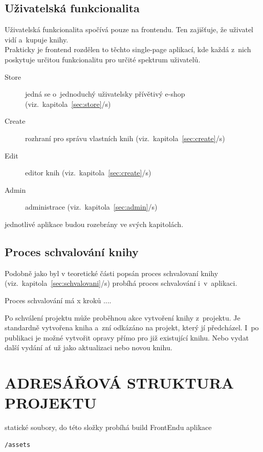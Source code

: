 \documentclass[a4paper,12pt,twoside,BCOR=10mm]{article}
\newcommand{\upc}[1]{\uppercase{#1}} %
\newcommand{\odkazNaKapitolu}[1]{(viz.~kapitola~\ref{#1}/s\pageref{#1})}
\newenvironment{codeframe}{%
  \begin{Sbox} 
    \begin{minipage} 
      {\columnwidth-\leftmargin-\rightmargin-2\fboxsep-2\fboxrule-4pt} 
}{%

  \end{minipage} 
  \end{Sbox} 
  \begin{center} 
    \fcolorbox{black}{codeback}{\TheSbox} 
  \end{center} 
}
\begin{document}
\subsection{Uživatelská funkcionalita}
Uživatelská funkcionalita spočívá pouze na frontendu. Ten zajišťuje, že uživatel vidí a~kupuje knihy.\\
Prakticky je frontend rozdělen to těchto single-page aplikací, kde každá z~nich poskytuje určitou funkcionalitu pro určité spektrum uživatelů.\\

\begin{description}
 \item[Store] jedná se o~jednoduchý uživatelsky přívětivý e-shop \odkazNaKapitolu{sec:store}
 \item[Create] rozhraní pro správu vlastních knih \odkazNaKapitolu{sec:create}
 \item[Edit] editor knih \odkazNaKapitolu{sec:create}
 \item[Admin] administrace \odkazNaKapitolu{sec:admin}
\end{description}

jednotlivé aplikace budou rozebrány ve svých kapitolách.

\subsection{Proces schvalování knihy}
Podobně jako byl v teoretické části popsán proces schvalovaní knihy \odkazNaKapitolu{sec:schvalovani} probíhá proces schvalování i~v~aplikaci.

Proces schvalování má x kroků
....

Po schválení projektu může proběhnou akce vytvoření knihy z~projektu. Je standardně vytvořena kniha a~zní odkázáno na projekt, který jí předcházel. I~po publikaci je možné vytvořit opravy přímo pro již existující knihu. Nebo vydat další vydání ať už jako aktualizaci nebo novou knihu.

\section{\upc{Adresářová struktura projektu}}

statické soubory, do této složky probíhá build FrontEndu aplikace
\begin{codeframe}
  \begin{verbatim}
/assets
  \end{verbatim}
\end{codeframe}
\end{document}
